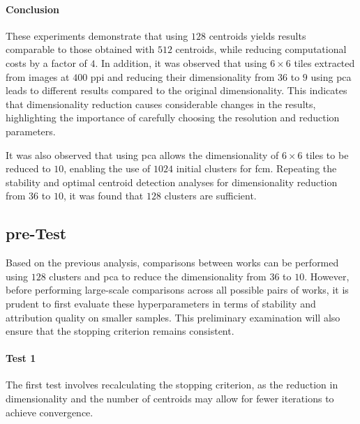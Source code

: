 \begin{toReview}
	\paragraph{Conclusion}
	These experiments demonstrate that using $128$ centroids yields results comparable to those obtained with $512$ centroids, while reducing computational costs by a factor of $4$. In addition, it was observed that using $6\times6$ tiles extracted from images at $400$ \gls{ppi} and reducing their dimensionality from $36$ to $9$ using \gls{pca} leads to different results compared to the original dimensionality. This indicates that dimensionality reduction causes considerable changes in the results, highlighting the importance of carefully choosing the resolution and reduction parameters.

	\noindent It was also observed that using \gls{pca} allows the dimensionality of $6\times6$ tiles to be reduced to $10$, enabling the use of $1024$ initial clusters for \gls{fcm}. Repeating the stability and optimal centroid detection analyses for dimensionality reduction from $36$ to $10$, it was found that $128$ clusters are sufficient.

	\subsection{pre-Test}
	Based on the previous analysis, comparisons between works can be performed using $128$ clusters and \gls{pca} to reduce the dimensionality from $36$ to $10$. However, before performing large-scale comparisons across all possible pairs of works, it is prudent to first evaluate these hyperparameters in terms of stability and attribution quality on smaller samples. This preliminary examination will also ensure that the stopping criterion remains consistent.

	\paragraph{Test 1}
	The first test involves recalculating the stopping criterion, as the reduction in dimensionality and the number of centroids may allow for fewer iterations to achieve convergence.


\end{toReview}
